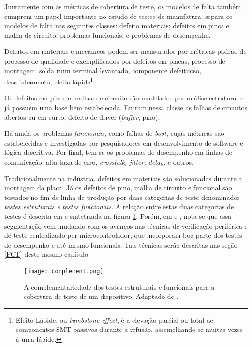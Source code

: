 Juntamente com as métricas de cobertura de teste, os modelos de falta também cumprem um papel importante no estudo de testes de manufatura. \citet{jutman2014high} separa os modelos de falta nas seguintes classes: defeito materiais; defeitos em pinos e malha de circuito; problemas funcionais; e problemas de desempenho. 

Defeitos em materiais e mecânicos podem ser mensurados por métricas padrão de processo de qualidade e exemplificados por defeitos em placas, processo de montagem: solda ruim terminal levantado, componente defeituoso, desalinhamento, efeito lápide\footnote{Efeito Lápide, ou \textit{tumbstone effect}, é a elevação parcial ou total de componentes SMT passivos durante a refusão, assemelhando-se muitas vezes à uma lápide.}.

Os defeitos em pinos e malhas de circuito são modelados por análise estrutural e já possuem uma base bem estabelecida. Entram nessa classe as falhas de circuitos abertos ou em curto, defeito de driver (\textit{buffer}, pino).

Há ainda os problemas \textit{funcionais}, como falhas de \textit{boot}, cujas métricas são estabelecidas e investigadas por pesquisadores em desenvolvimento de software e lógica descritiva.
Por final, tem-se os problemas de desempenho em linhas de comunicação: alta taxa de erro, \textit{crosstalk, jitter, delay,} e outros.

Tradicionalmente na indústria, defeitos em materiais são solucionados durante a montagem da placa. Já os defeitos de pino, malha de circuito e funcional são testados no fim de linha de produção por duas categorias de teste denominados \textit{testes estruturais e testes funcionais}. A relação entre estas duas categorias de testes é descrita em  \citet{thomaswenzelenricozimmermann2016} e sintetizada na figura \ref{fig:cobertura}. Porém, em \citet{thomaswenzel2013} e \citet{jutman2014high}, nota-se que essa segmentação vem mudando com os avanços nas técnicas de verificação periférica e de teste centralizado por microcontrolador, que incorporam boa parte dos testes de desempenho e até mesmo funcionais. Tais técnicas serão descritas nas seção \ref{FCT} deste mesmo capítulo.

\begin{figure}[ht]
    \centering
    \texttt{[image: complement.png]}
    \caption{A complementariedade dos testes estruturais e funcionais para a cobertura de teste de um dispositivo. Adaptado de \cite{thomaswenzelenricozimmermann2016}.}
    \label{fig:cobertura}
\end{figure}

